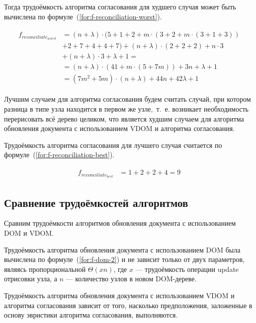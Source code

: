 Тогда трудоёмкость алгоритма согласования для худшего случая может быть вычислена по формуле~(\ref{for:f-reconciliation-worst}).

\begin{align}
	\begin{split}
		\label{for:f-reconciliation-worst}
		f_{reconciliate_{worst}} &= (n + \lambda) \cdot (5 + 1 + 2 + m \cdot (3 + 2 + m \cdot (3 + 1 + 3)) \\
		&+ 2 + 7 + 4 + 4 + 7) + (n + \lambda) \cdot (2 + 2 + 2) + n \cdot 3 \\
		&+ (n + \lambda) \cdot 3 + \lambda + 1 =\\
		&= (n + \lambda) \cdot (41 + m \cdot (5 + 7m)) + 3n + \lambda + 1 \\
		&= (7m^2 + 5m)\cdot(n + \lambda) + 44n + 42\lambda + 1
	\end{split}
\end{align}

Лучшим случаем для алгоритма согласования будем считать случай, при котором разница в типе узла находится в первом же узле,~т.~е. возникает необходимость перерисовать всё дерево целиком, что является худшим случаем для алгоритма обновления документа с использованием VDOM и алгоритма согласования.

Трудоёмкость алгоритма согласования для лучшего случая считается по формуле~(\ref{for:f-reconciliation-best}).

\begin{align}
	\begin{split}
		\label{for:f-reconciliation-best}
		f_{reconciliate_{best}} &= 1 + 2 + 2 + 4 = 9
	\end{split}
\end{align}

\subsection{Сравнение трудоёмкостей алгоритмов}

Сравним трудоёмкости алгоритмов обновления документа с использованием DOM и VDOM.

Трудоёмкость алгоритма обновления документа с использованием DOM была вычислена по формуле~(\ref{for:f-dom-2}) и не зависит только от двух параметров, являясь пропорциональной $\Theta(xn)$, где $x$ --- трудоёмкость операции update отрисовки узла, а $n$ --- количество узлов в новом DOM-дереве.

Трудоёмкость алгоритма обновления документа с использованием VDOM и алгоритма согласования зависит от того, насколько предположения, заложенные в основу эвристики алгоритма согласования, выполняются.

